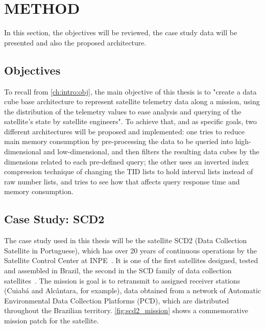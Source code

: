 
\chapter{METHOD}\label{ch:prop}

In this section, the objectives will be reviewed, the case study data will be presented and also the proposed architecture.


\section{Objectives}\label{ch:prop:obj}

To recall from \autoref{ch:intro:obj}, the main objective of this thesis is to "create a data cube base architecture to represent satellite telemetry data along a mission, using the distribution of the telemetry values to ease analysis and querying of the satellite's state by satellite engineers".
To achieve that, and as specific goals, two different architectures will be proposed and implemented: one tries to reduce main memory consumption by pre-processing the data to be queried into high-dimensional and low-dimensional, and then filters the resulting data cubes by the dimensions related to each pre-defined query; the other uses an inverted index compression technique of changing the TID lists to hold interval lists instead of raw number lists, and tries to see how that affects query response time and memory consumption.

\section{Case Study: SCD2}\label{ch:prop:scd2}

The case study used in this thesis will be the satellite SCD2 (Data Collection Satellite in Portuguese), which has over 20 years of continuous operations by the Satellite Control Center at INPE~\cite{OrlandoKuga:2007:SaSCSC}.
It is one of the first satellites designed, tested and assembled in Brazil, the second in the SCD family of data collection satellites~\cite{Oliveira:1996:SC1Sa}.
The mission is goal is to retransmit to assigned receiver stations (Cuiabá and Alcântara, for example), data obtained from a network of Automatic Environmental Data Collection Platforms (PCD), which are distributed throughout the Brazilian territory.
\autoref{fig:scd2_mission} shows a commemorative mission patch for the satellite.

